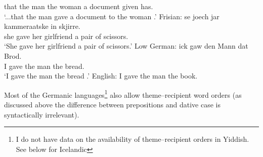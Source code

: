 \begin{exe}
\begin{xlist}
that the man the woman a document given has.\\
\trans `...that the man gave a document to the woman \citep{Louw.2012}.'
\ex Frisian:
\gll se joech jar kammeraatske in skjirre.\\
she gave her girlfriend a {pair of scissors}.\\
\trans `She gave her girlfriend a pair of scissors.'
\ex Low German: 
\gll ick gaw den Mann dat Brod.\\
I gave the man the bread.\\
\trans `I gave the man the bread \citep{Mussaus.1829}.'
\ex English: I gave the man the book.
\end{xlist}
\end{exe}

Most of the Germanic languages\footnote{I do not have data on the availability of theme--recipient orders in Yiddish. See below for Icelandic} also allow theme--recipient word orders (as discussed above the difference between prepositions and dative case is syntactically irrelevant).

